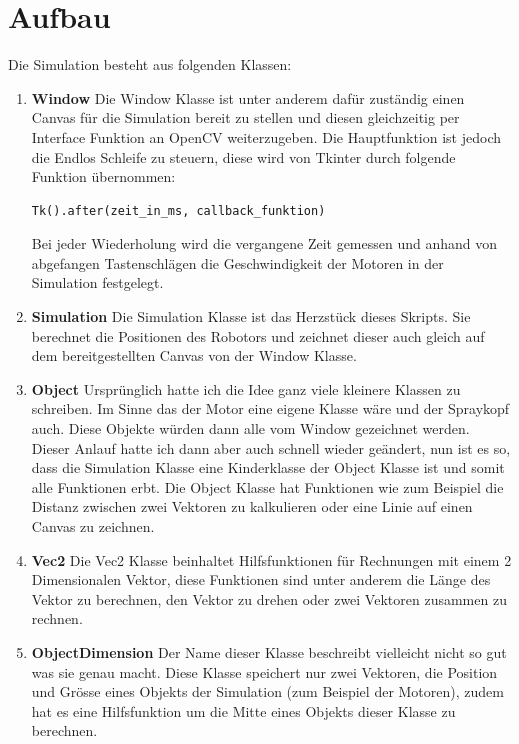 \documentclass[12pt]{article}
\begin{document}
\section{Aufbau}
Die Simulation besteht aus folgenden Klassen:
\begin{enumerate} 
\item \textbf{Window}\newline
Die Window Klasse ist unter anderem dafür zuständig einen Canvas für die Simulation bereit zu stellen und diesen gleichzeitig per Interface Funktion an OpenCV weiterzugeben.
Die Hauptfunktion ist jedoch die Endlos Schleife zu steuern, diese wird von Tkinter durch folgende Funktion übernommen:
\begin{lstlisting}
Tk().after(zeit_in_ms, callback_funktion)
\end{lstlisting}
Bei jeder Wiederholung wird die vergangene Zeit gemessen und anhand von abgefangen Tastenschlägen die Geschwindigkeit der Motoren in der Simulation festgelegt.
\item \textbf{Simulation}\newline
Die Simulation Klasse ist das Herzstück dieses Skripts. Sie berechnet die Positionen des Robotors und zeichnet dieser auch gleich auf dem bereitgestellten Canvas von der Window Klasse.
\item \textbf{Object}\newline
Ursprünglich hatte ich die Idee ganz viele kleinere Klassen zu schreiben. Im Sinne das der Motor eine eigene Klasse wäre und der Spraykopf auch. Diese Objekte würden dann alle vom Window gezeichnet werden. Dieser Anlauf hatte ich dann aber auch schnell wieder geändert, nun ist es so, dass die Simulation Klasse eine Kinderklasse der Object Klasse ist und somit alle Funktionen erbt. Die Object Klasse hat Funktionen wie zum Beispiel die Distanz zwischen zwei Vektoren zu kalkulieren oder eine Linie auf einen Canvas zu zeichnen.
\item \textbf{Vec2}\newline
Die Vec2 Klasse beinhaltet Hilfsfunktionen für Rechnungen mit einem 2 Dimensionalen Vektor, diese Funktionen sind unter anderem die Länge des Vektor zu berechnen, den Vektor zu drehen oder zwei Vektoren zusammen zu rechnen.
\item \textbf{ObjectDimension}\newline
Der Name dieser Klasse beschreibt vielleicht nicht so gut was sie genau macht. Diese Klasse speichert nur zwei Vektoren, die Position und Grösse eines Objekts der Simulation (zum Beispiel der Motoren), zudem hat es eine Hilfsfunktion um die Mitte eines Objekts dieser Klasse zu berechnen.
\end{enumerate}
\end{document}
